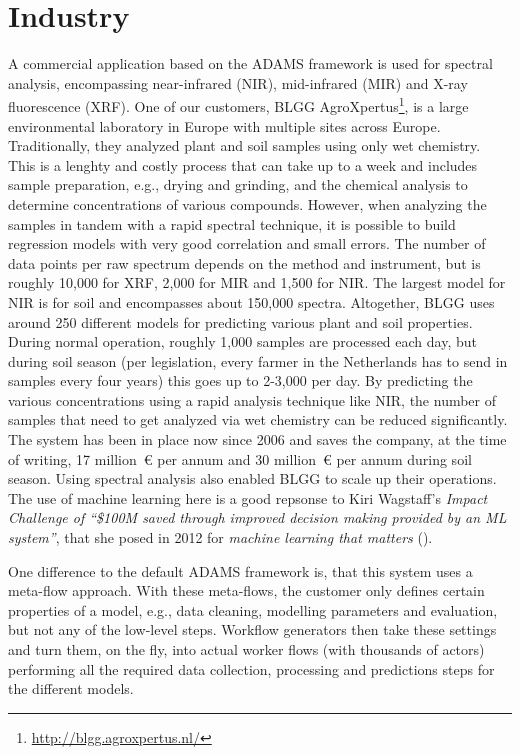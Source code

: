 \documentclass[wcp]{jmlr}
\begin{document}
\section{Industry}
A commercial application based on the ADAMS framework is used for spectral analysis, encompassing near-infrared (NIR), mid-infrared (MIR) and X-ray fluorescence (XRF). One of our customers, BLGG AgroXpertus\footnote{\url{http://blgg.agroxpertus.nl/}{}}, is a large environmental laboratory in Europe with multiple sites across Europe. Traditionally, they analyzed plant and soil samples using only wet chemistry. This is a lenghty and costly process that can take up to a week and  includes sample preparation, e.g., drying and grinding, and the chemical analysis to determine concentrations of various compounds. However, when analyzing the samples in tandem with a rapid spectral technique, it is possible to build regression models with very good correlation and small errors. The number of data points per raw spectrum depends on the method and instrument, but is roughly 10,000 for XRF, 2,000 for MIR and 1,500 for NIR. The largest model for NIR is for soil and encompasses about 150,000 spectra. Altogether, BLGG uses around 250 different models for predicting various plant and soil properties. During normal operation, roughly 1,000 samples are processed each day, but during soil season (per legislation, every farmer in the Netherlands has to send in samples every four years) this goes up to 2-3,000 per day. By predicting the various concentrations using a rapid analysis technique like NIR, the number of samples that need to get analyzed via wet chemistry can be reduced significantly. The system has been in place now since 2006 and saves the company, at the time of writing, 17 million~\euro{} per annum and 30 million~\euro{} per annum during soil season. Using spectral analysis also enabled BLGG to scale up their operations. The use of machine learning here is a good repsonse to Kiri Wagstaff's \textit{Impact Challenge of ``\$100M saved through improved decision making provided by an ML system''}, that she posed in 2012 for \textit{machine learning that matters} (\cite{wagstaff}).

One difference to the default ADAMS framework is, that this system uses a meta-flow approach. With these meta-flows, the customer only defines certain properties of a model, e.g., data cleaning, modelling parameters and evaluation, but not any of the low-level steps. Workflow generators then take these settings and turn them, on the fly, into actual worker flows (with thousands of actors) performing all the required data collection, processing and predictions steps for the different models.



\end{document}
